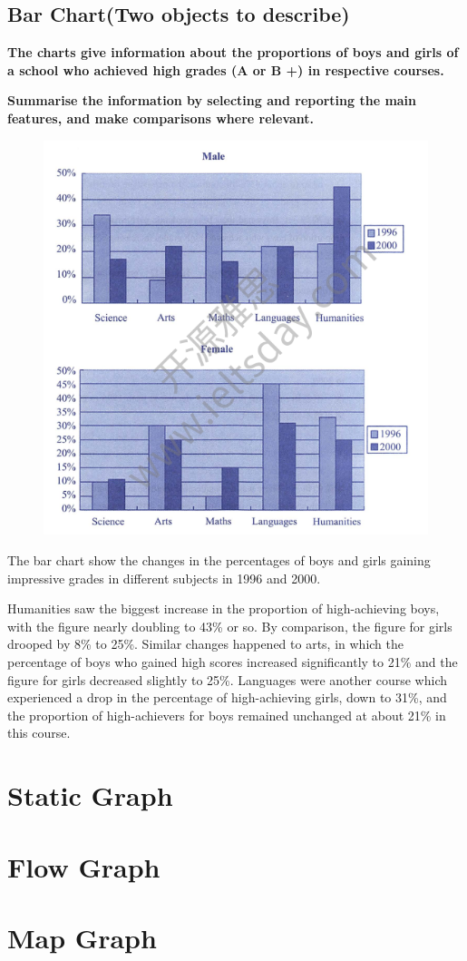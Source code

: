 \documentclass[conference]{IEEEtran}
\begin{document}
\subsection{Bar Chart(Two objects to describe)}

\textbf{The charts give information about the proportions of boys and girls of a school who
achieved high grades (A or B +) in respective courses.}

\textbf{Summarise the information by selecting and reporting the main features, and make
comparisons where relevant.}

\begin{figure}[htbp]
    \centerline{\includegraphics[width=1.1\columnwidth]{images/Screenshot from 2022-12-04 22-40-33.png}}
\end{figure}

The bar chart show the changes in the percentages of boys and girls gaining impressive grades in different subjects in 1996 and 2000.

Humanities saw the biggest increase in the proportion of high-achieving boys, with the figure nearly doubling to 43\% or so.
By comparison, the figure for girls drooped by 8\% to 25\%.
Similar changes happened to arts, in which the percentage of boys who gained high scores increased significantly to 21\% and
the figure for girls decreased slightly to 25\%.
Languages were another course which experienced a drop in the percentage of high-achieving girls, down to 31\%,
and the proportion of high-achievers for boys remained unchanged at about 21\% in this course.




\section{Static Graph}

\section{Flow Graph}

\section{Map Graph}
\end{document}
